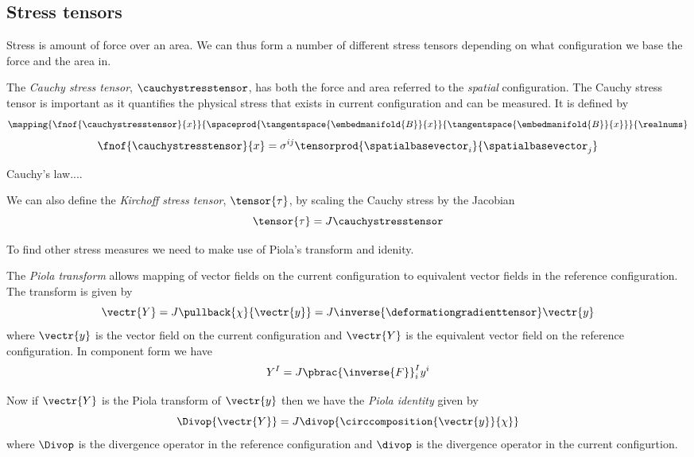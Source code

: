 \subsection{Stress tensors}

Stress is amount of force over an area. We can thus form a number of different
stress tensors depending on what configuration we base the force and the area
in.

The \emph{Cauchy stress tensor}, $\cauchystresstensor$, has both the force and
area referred to the \emph{spatial} configuration. The Cauchy stress tensor is
important as it quantifies the physical stress that exists in current
configuration and can be measured. It is defined by
\begin{equation}
  \mapping{\fnof{\cauchystresstensor}{x}}{\spaceprod{\tangentspace{\embedmanifold{B}}{x}}{\tangentspace{\embedmanifold{B}}{x}}}{\realnums}
\end{equation}
\ie
\begin{equation}
  \fnof{\cauchystresstensor}{x}=\sigma^{ij}\tensorprod{\spatialbasevector_{i}}{\spatialbasevector_{j}}
\end{equation}

Cauchy's law....

We can also define the \emph{Kirchoff stress tensor}, $\tensor{\tau}$, by
scaling the Cauchy stress by the Jacobian \ie
\begin{equation}
  \tensor{\tau}=J\cauchystresstensor
\end{equation}

To find other stress measures we need to make use of Piola's transform and
idenity.

The \emph{Piola transform} allows mapping of vector fields on the current
configuration to equivalent vector fields in the reference configuration. The
transform is given by
\begin{equation}
  \vectr{Y}=J\pullback{\chi}{\vectr{y}}=J\inverse{\deformationgradienttensor}\vectr{y}
\end{equation}
where $\vectr{y}$ is the vector field on the current configuration and
$\vectr{Y}$ is the equivalent vector field on the reference configuration. In
component form we have
\begin{equation}
  Y^{I}=J\pbrac{\inverse{F}}^{I}_{i}y^{i}
\end{equation}

Now if $\vectr{Y}$ is the Piola transform of $\vectr{y}$ then we have the
\emph{Piola identity} given by
\begin{equation}
  \Divop{\vectr{Y}}=J\divop{\circcomposition{\vectr{y}}{\chi}}
\end{equation}
where $\Divop$ is the divergence operator in the reference configuration and
$\divop$ is the divergence operator in the current configurtion. 

